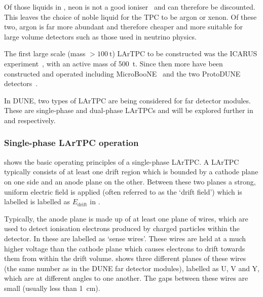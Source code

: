 Of those liquids in , neon is not a good ioniser~\cite{schumann2012dark} and can therefore be discounted.
This leaves the choice of noble liquid for the TPC to be argon or xenon.
Of these two, argon is far more abundant and therefore cheaper and more suitable for large volume detectors such as those used in neutrino physics.

The first large scale (mass $>\SI{100}{\tonne}$) LArTPC to be constructed was the ICARUS experiment~\cite{icarus}, with an active mass of \SI{500}{\tonne}.
Since then more have been constructed and operated including MicroBooNE~\cite{uBooneConstruct} and the two ProtoDUNE detectors~\cite{protoduneSP_tdr, cuesta2019status}.

In DUNE, two types of LArTPC are being considered for far detector modules.
These are single-phase and dual-phase LArTPCs and will be explored further in  and  respectively.

\subsubsection{Single-phase LArTPC operation}
\label{sec:dune:fd:lartpc:singlephase}

 shows the basic operating principles of a single-phase LArTPC.
A LArTPC typically consists of at least one drift region which is bounded by a cathode plane on one side and an anode plane on the other.
Between these two planes a strong, uniform electric field is applied (often referred to as the `drift field') which is labelled is labelled as $E_{\text{drift}}$ in .

Typically, the anode plane is made up of at least one plane of wires, which are used to detect ionisation electrons produced by charged particles within the detector.
In  these are labelled as `sense wires'.
These wires are held at a much higher voltage than the cathode plane which causes electrons to drift towards them from within the drift volume.
 shows three different planes of these wires (the same number as in the DUNE far detector modules), labelled as U, V and Y, which are at different angles to one another.
The gaps between these wires are small (usually less than \SI{1}{\centi\metre}).

